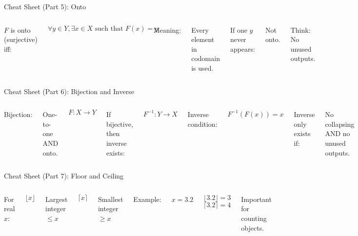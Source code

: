 \documentclass[aspectratio=169]{beamer}
\begin{document}
\begin{frame}{Cheat Sheet (Part 5): Onto}
\begin{columns}
$F$ is onto (surjective) iff:

\[
\forall y \in Y,
\exists x \in X
\text{ such that } F(x)=y
\]

Meaning:

Every element in codomain is used.

If one $y$ never appears:

Not onto.

Think: No unused outputs.
\end{columns}
\end{frame}

\begin{frame}{Cheat Sheet (Part 6): Bijection and Inverse}
\begin{columns}
Bijection:

One-to-one AND onto.

\[
F: X \to Y
\]

If bijective, then inverse exists:

\[
F^{-1}: Y \to X
\]

Inverse condition:

\[
F^{-1}(F(x)) = x
\]

Inverse only exists if:

No collapsing AND no unused outputs.
\end{columns}
\end{frame}

\begin{frame}{Cheat Sheet (Part 7): Floor and Ceiling}
\begin{columns}
For real $x$:

\[
\lfloor x \rfloor
\]

Largest integer $\le x$

\[
\lceil x \rceil
\]

Smallest integer $\ge x$

Example:

$x = 3.2$

\[
\lfloor 3.2 \rfloor = 3
\]
\[
\lceil 3.2 \rceil = 4
\]

Important for counting objects.
\end{columns}
\end{frame}
\end{document}
